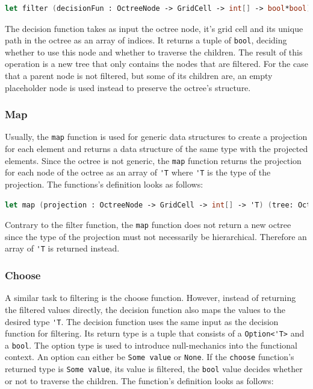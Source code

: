 \begin{lstlisting}[language = FSharp]
let filter (decisionFun : OctreeNode -> GridCell -> int[] -> bool*bool) (tree: Octree) : (Octree)= ...
\end{lstlisting}

The decision function takes as input the octree node, it's grid cell and its unique path in the octree as an array of indices. It returns a tuple of \verb|bool|, deciding whether to use this node and whether to traverse the children. The result of this operation is a new tree that only contains the nodes that are filtered. For the case that a parent node is not filtered, but some of its children are, an empty placeholder node is used instead to preserve the octree's structure. 


\subsubsection{Map}

Usually, the \verb|map| function is used for generic data structures to create a projection for each element and returns a data structure of the same type with the projected elements. Since the octree is not generic, the \verb|map| function returns the projection for each node of the octree as an array of \verb|'T| where \verb|'T| is the type of the projection. 
The functions's definition looks as follows: 

\begin{lstlisting}[language = FSharp]
let map (projection : OctreeNode -> GridCell -> int[] -> 'T) (tree: Octree) : ('T[])= ...
\end{lstlisting}

Contrary to the filter function, the \verb|map| function does not return a new octree since the type of the projection must not necessarily be hierarchical. Therefore an array of \verb|'T| is returned instead. 


\subsubsection{Choose}

A similar task to filtering is the choose function. However, instead of returning the filtered values directly, the decision function also maps the values to the desired type \verb|'T|. The decision function uses the same input as the decision function for filtering. Its return type is a tuple that consists of a \verb|Option<'T>| and a \verb|bool|. The option type is used to introduce null-mechanics into the functional context. An option can either be \verb|Some value| or \verb|None|. If the \verb|choose| function's returned type is \verb|Some value|, its value is filtered, the \verb|bool| value decides whether or not to traverse the children. 
The function's definition looks as follows: 

